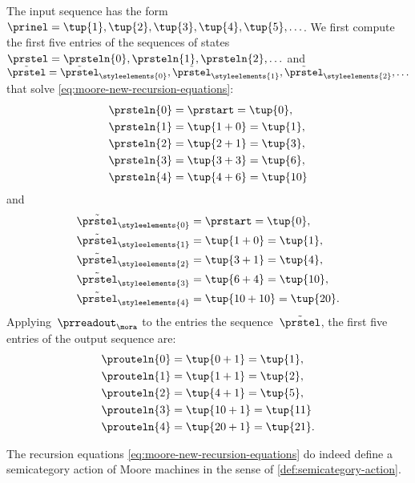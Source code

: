 \begin{example}
    The input sequence has the form~$\prinel = \tup{1}, \tup{2}, \tup{3}, \tup{4}, \tup{5}, \ldots$.
    We first compute the first five entries of the sequences of states~$\prstel = \prsteln{0}, \prsteln{1}, \prsteln{2}, \ldots$ and~$\tilde{\prstel} = \tilde{\prstel}_\styleelements{0}, \tilde{\prstel}_\styleelements{1}, \tilde{\prstel}_\styleelements{2}, \ldots$ that solve \cref{eq:moore-new-recursion-equations}:
    \begin{align*}
        \prsteln{0} & = \prstart = \tup{0}, \\
        \prsteln{1} & = \tup{1 + 0} = \tup{1}, \\
        \prsteln{2} & = \tup{2 + 1} = \tup{3}, \\
        \prsteln{3} & = \tup{3 + 3} = \tup{6}, \\
        \prsteln{4} & = \tup{4 + 6} = \tup{10}
    \end{align*}
    and
    \begin{align*}
        \tilde{\prstel}_\styleelements{0} & = \prstart = \tup{0}, \\
        \tilde{\prstel}_\styleelements{1} & = \tup{1 + 0} = \tup{1}, \\
        \tilde{\prstel}_\styleelements{2} & = \tup{3 + 1} = \tup{4}, \\
        \tilde{\prstel}_\styleelements{3} & = \tup{6 + 4} = \tup{10}, \\
        \tilde{\prstel}_\styleelements{4} & = \tup{10 + 10} = \tup{20}.
    \end{align*}
    Applying~$\prreadout_\mora$ to the entries the sequence~$\tilde \prstel$, the first five entries of the output sequence are:
    \begin{align*}
        \prouteln{0} & = \tup{0 + 1} = \tup{1}, \\
        \prouteln{1} & = \tup{1 + 1} = \tup{2}, \\
        \prouteln{2} & = \tup{4 + 1} = \tup{5}, \\
        \prouteln{3} & = \tup{10 + 1} = \tup{11} \\
        \prouteln{4} & = \tup{20 + 1} = \tup{21}.
    \end{align*}
\end{example}


\begin{lemma}
    The recursion equations \cref{eq:moore-new-recursion-equations} do indeed define a semicategory action of Moore machines in the sense of \cref{def:semicategory-action}.
\end{lemma}

